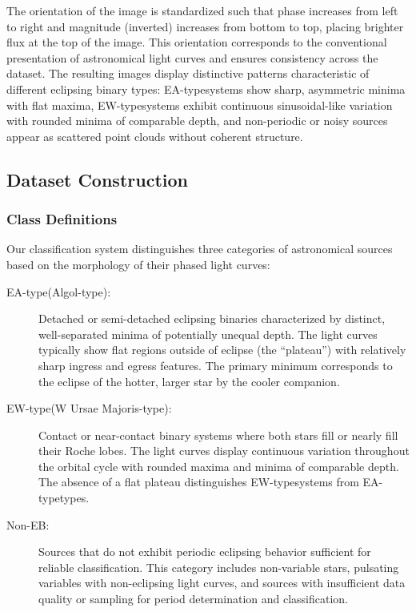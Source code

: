 \documentclass[11pt,a4paper]{article}
\newcommand{\EA}{EA-type}
\newcommand{\EW}{EW-type}
\begin{document}
The orientation of the image is standardized such that phase increases from left to right and magnitude (inverted) increases from bottom to top, placing brighter flux at the top of the image. This orientation corresponds to the conventional presentation of astronomical light curves and ensures consistency across the dataset. The resulting images display distinctive patterns characteristic of different eclipsing binary types: \EA systems show sharp, asymmetric minima with flat maxima, \EW systems exhibit continuous sinusoidal-like variation with rounded minima of comparable depth, and non-periodic or noisy sources appear as scattered point clouds without coherent structure.

\subsection{Dataset Construction}

\subsubsection{Class Definitions}

Our classification system distinguishes three categories of astronomical sources based on the morphology of their phased light curves:

\begin{description}
    \item[\EA (Algol-type):] Detached or semi-detached eclipsing binaries characterized by distinct, well-separated minima of potentially unequal depth. The light curves typically show flat regions outside of eclipse (the ``plateau'') with relatively sharp ingress and egress features. The primary minimum corresponds to the eclipse of the hotter, larger star by the cooler companion.
    
    \item[\EW (W Ursae Majoris-type):] Contact or near-contact binary systems where both stars fill or nearly fill their Roche lobes. The light curves display continuous variation throughout the orbital cycle with rounded maxima and minima of comparable depth. The absence of a flat plateau distinguishes \EW systems from \EA types.
    
    \item[Non-EB:] Sources that do not exhibit periodic eclipsing behavior sufficient for reliable classification. This category includes non-variable stars, pulsating variables with non-eclipsing light curves, and sources with insufficient data quality or sampling for period determination and classification.
\end{description}
\end{document}
